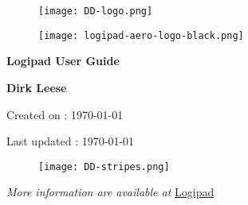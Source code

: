         \begin{titlepage}
            \centering
            \vspace*{0mm} %
            \begin{figure}[!h]
                \vspace*{-20mm}
                \texttt{[image: DD-logo.png]}
            \end{figure}
            \vspace{30mm} %
            \begin{figure}[!h]
                \centering
                \texttt{[image: logipad-aero-logo-black.png]}
            \end{figure}

            \vspace{10mm} 
            \textbf{\Huge {Logipad User Guide}}

            \vspace{30mm}
            \Large \textbf{{Dirk Leese}}

            \small Created on : \today

            \vspace*{0mm}
            \small  Last updated : \MonthYearFormat\today
            
            \vspace{50mm}
            \begin{figure}[!h]
                \hspace*{-20mm}
                \texttt{[image: DD-stripes.png]}
            \end{figure}
            \vfill
            \small \textit{More information are available at }{\href{http://www.logipad.aero}{Logipad}}
        \end{titlepage}

        \tableofcontents
        \clearpage
